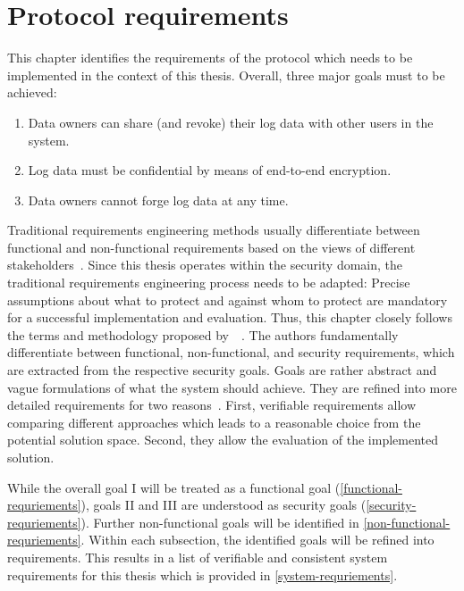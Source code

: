 \documentclass[../main.tex]{subfiles}
\begin{document}
\chapter{Protocol requirements}
\label{chap:requirements}

This chapter identifies the requirements of the protocol which needs to be implemented in the context of this thesis.
Overall, three major goals must to be achieved:

\begin{enumerate}[label=\Roman*.]
    \item Data owners can share (and revoke) their log data with other users in the system.
	\item Log data must be confidential by means of end-to-end encryption.
    \item Data owners cannot forge log data at any time.
\end{enumerate}

Traditional requirements engineering methods usually differentiate between functional and non-functional requirements based on the views of different stakeholders~\cite{Rehman2013}.
Since this thesis operates within the security domain, the traditional requirements engineering process needs to be adapted: 
Precise assumptions about what to protect and against whom to protect are mandatory for a successful implementation and evaluation.
Thus, this chapter closely follows the terms and methodology proposed by~\citeauthor{Fabian2010}~\cite{Fabian2010}.
The authors fundamentally differentiate between functional, non-functional, and security requirements, which are extracted from the respective security goals.
Goals are rather abstract and vague formulations of what the system should achieve. 
They are refined into more detailed requirements for two reasons~\cite{Fabian2010}.
First, verifiable requirements allow comparing different approaches which leads to a reasonable choice from the potential solution space.
Second, they allow the evaluation of the implemented solution.

While the overall goal I will be treated as a functional goal (\cref{functional-requriements}), goals II and III are understood as security goals (\cref{security-requriements}).
Further non-functional goals will be identified in \cref{non-functional-requriements}.
Within each subsection, the identified goals will be refined into requirements.
This results in a list of verifiable and consistent system requirements for this thesis which is provided in \cref{system-requriements}.
\end{document}
